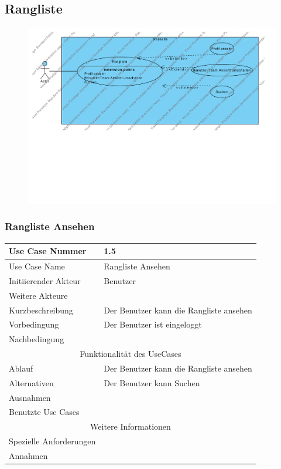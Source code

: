 \documentclass[10pt,a4paper]{article}
\begin{document}
\subsection{Rangliste}
	\begin{figure}[h]
		\includegraphics[width=\linewidth]{gfx/webseite/rangliste.pdf}
	\end{figure}
	\subsubsection{Rangliste Ansehen}
		\begin{tabular}{|l|p{.5\linewidth}|}
		\hline Use Case Nummer & 1.5 \\ 
		\hline Use Case Name & Rangliste Ansehen \\ 
		\hline Initiierender Akteur & Benutzer \\
		\hline Weitere Akteure &  \\
		\hline Kurzbeschreibung & Der Benutzer kann die Rangliste ansehen \\
		\hline Vorbedingung & Der Benutzer ist eingeloggt \\
		\hline Nachbedingung &  \\
		\hline \multicolumn{2}{|c|}{Funktionalität des UseCases}\\
		\hline Ablauf & Der Benutzer kann die Rangliste ansehen \\
		\hline Alternativen & Der Benutzer kann Suchen \\
		\hline Ausnahmen &  \\
		\hline Benutzte Use Cases &  \\
		\hline \multicolumn{2}{|c|}{Weitere Informationen} \\
		\hline Spezielle Anforderungen &  \\
		\hline Annahmen &  \\
		\hline
		\end{tabular}
\end{document}
